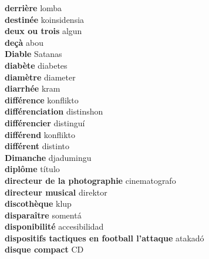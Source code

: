 \textbf{ derrière  } lomba \\
\textbf{ destinée  } koinsidensia \\
\textbf{ deux ou trois  } algun \\
\textbf{ deçà  } abou \\
\textbf{ Diable  } Satanas \\
\textbf{ diabète  } diabetes \\
\textbf{ diamètre  } diameter \\
\textbf{ diarrhée  } kram \\
\textbf{ différence  } konflikto \\
\textbf{ différenciation  } distinshon \\
\textbf{ différencier  } distinguí \\
\textbf{ différend  } konflikto \\
\textbf{ différent  } distinto \\
\textbf{ Dimanche  } djadumingu \\
\textbf{ diplôme  } título \\
\textbf{ directeur de la photographie  } cinematografo \\
\textbf{ directeur musical  } direktor \\
\textbf{ discothèque  } klup \\
\textbf{ disparaître  } somentá \\
\textbf{ disponibilité  } accesibilidad \\
\textbf{ dispositifs tactiques en football l’attaque  } atakadó \\
\textbf{ disque compact  } CD \\
